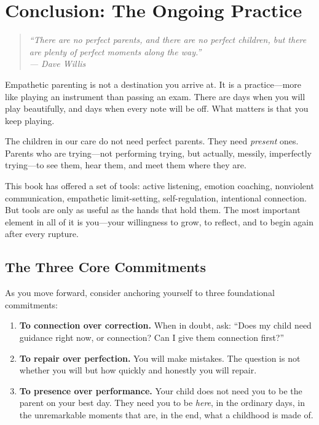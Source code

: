 \chapter*{Conclusion: The Ongoing Practice}

\begin{quote}
\itshape ``There are no perfect parents, and there are no perfect children, 
but there are plenty of perfect moments along the way.''\\
\upshape --- Dave Willis
\end{quote}

Empathetic parenting is not a destination you arrive at. It is a 
practice---more like playing an instrument than passing an exam. There are 
days when you will play beautifully, and days when every note will be off. 
What matters is that you keep playing.

The children in our care do not need perfect parents. They need 
\textit{present} ones. Parents who are trying---not performing trying, 
but actually, messily, imperfectly trying---to see them, hear them, and 
meet them where they are.

This book has offered a set of tools: active listening, emotion coaching, 
nonviolent communication, empathetic limit-setting, self-regulation, 
intentional connection. But tools are only as useful as the hands that 
hold them. The most important element in all of it is you---your 
willingness to grow, to reflect, and to begin again after every rupture.

\section*{The Three Core Commitments}

As you move forward, consider anchoring yourself to three foundational 
commitments:

\begin{enumerate}
  \item \textbf{To connection over correction.} When in doubt, ask: 
        ``Does my child need guidance right now, or connection? Can I 
        give them connection first?''
  \item \textbf{To repair over perfection.} You will make mistakes. 
        The question is not whether you will but how quickly and honestly 
        you will repair.
  \item \textbf{To presence over performance.} Your child does not need 
        you to be the parent on your best day. They need you to be 
        \textit{here}, in the ordinary days, in the unremarkable moments 
        that are, in the end, what a childhood is made of.
\end{enumerate}

